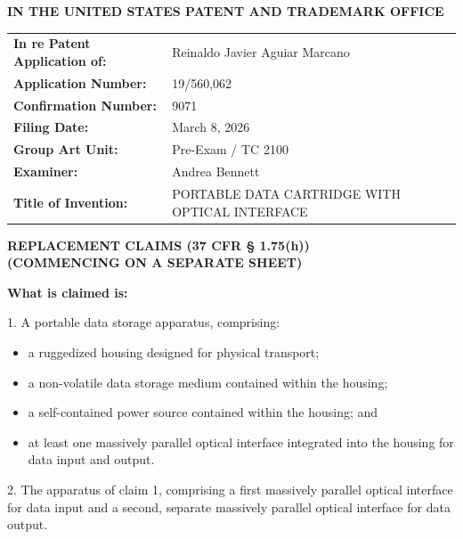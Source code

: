 \documentclass[11pt,letterpaper]{article}
\begin{document}
\thispagestyle{empty}

\begin{center}
    \large\textbf{IN THE UNITED STATES PATENT AND TRADEMARK OFFICE} \\
\end{center}

\vspace{0.2cm}
\noindent\begin{tabular}{p{2.3in}p{4.0in}}
\textbf{In re Patent Application of:} & Reinaldo Javier Aguiar Marcano \\
\textbf{Application Number:} & 19/560,062 \\
\textbf{Confirmation Number:} & 9071 \\
\textbf{Filing Date:} & March 8, 2026 \\
\textbf{Group Art Unit:} & Pre-Exam / TC 2100 \\
\textbf{Examiner:} & Andrea Bennett \\
\textbf{Title of Invention:} & PORTABLE DATA CARTRIDGE WITH OPTICAL INTERFACE \\
\end{tabular}

\vspace{0.6cm}
\begin{center}
    \textbf{\large REPLACEMENT CLAIMS (37 CFR \S{} 1.75(h))} \\
    \textbf{(COMMENCING ON A SEPARATE SHEET)}
\end{center}

\vspace{0.4cm}

\textbf{What is claimed is:}

1. A portable data storage apparatus, comprising:
\begin{itemize}[leftmargin=2.5em]
    \item[] a ruggedized housing designed for physical transport;
    \item[] a non-volatile data storage medium contained within the housing;
    \item[] a self-contained power source contained within the housing; and
    \item[] at least one massively parallel optical interface integrated into the housing for data input and output.
\end{itemize}

2. The apparatus of claim 1, comprising a first massively parallel optical interface for data input and a second, separate massively parallel optical interface for data output.
\end{document}
